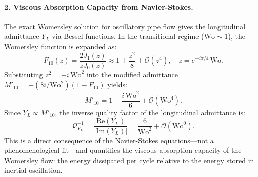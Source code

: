 \documentclass[11pt,a4paper]{article}
\theoremstyle{remark}
\begin{document}
\paragraph{2. Viscous Absorption Capacity from Navier-Stokes.}
The exact Womersley solution for oscillatory pipe flow gives the longitudinal
admittance $Y_L$ via Bessel functions. In the transitional regime ($\mathrm{Wo}
\sim 1$), the Womersley function is expanded as:
\begin{equation}\label{eq:F10_expansion_supp}
    F_{10}(z) = \frac{2J_1(z)}{zJ_0(z)} \approx 1 + \frac{z^2}{8} + \mathcal{O}(z^4),
    \quad z = e^{-i\pi/4}\,\mathrm{Wo}.
\end{equation}
Substituting $z^2 = -i\,\mathrm{Wo}^2$ into the modified admittance
$M'_{10} = -(8i/\mathrm{Wo}^2)(1 - F_{10})$ yields:
\begin{equation}\label{eq:M10_expansion_supp}
    M'_{10} = 1 - \frac{i\,\mathrm{Wo}^2}{6} + \mathcal{O}(\mathrm{Wo}^4).
\end{equation}
Since $Y_L \propto M'_{10}$, the inverse quality factor of the longitudinal
admittance is:
\begin{equation}\label{eq:tan_phi_asymptotic_supp}
    \mathcal{Q}^{-1}_{Y_L} = \frac{\text{Re}(Y_L)}{|\text{Im}(Y_L)|} = \frac{6}{\mathrm{Wo}^2} + \mathcal{O}(\mathrm{Wo}^{0}).
\end{equation}
This is a direct consequence of the Navier-Stokes equations---not a
phenomenological fit---and quantifies the viscous absorption capacity of the
Womersley flow: the energy dissipated per cycle relative to the energy stored in
inertial oscillation.
\end{document}
